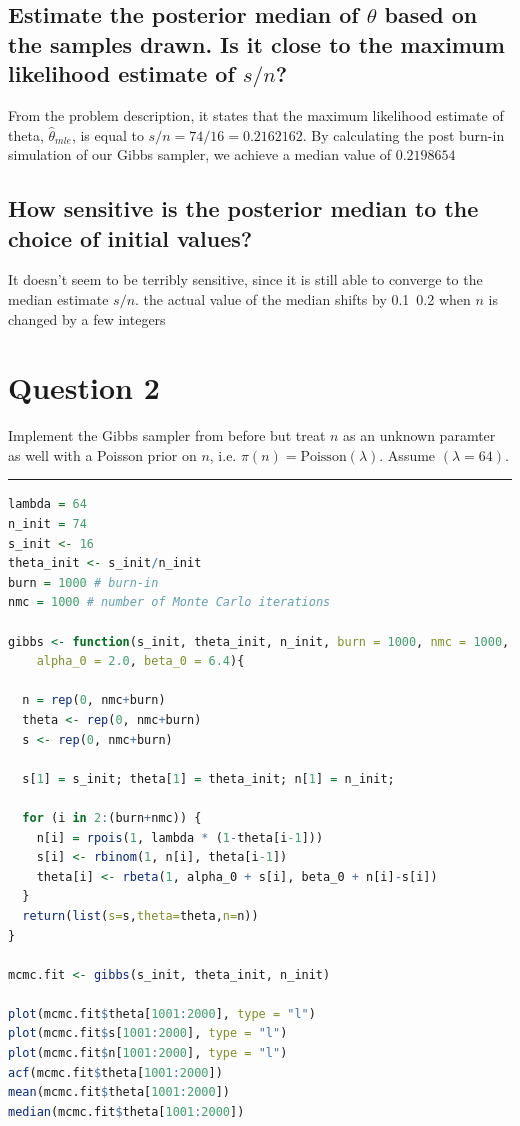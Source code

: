 \documentclass[20pt]{article} %
\begin{document}
\subsection{Estimate the posterior median of $\theta$ based on the samples drawn. Is it close to the maximum likelihood estimate of $s/n$?}
From the problem description, it states that the maximum likelihood estimate of theta, $\hat{\theta}_{mle}$, is equal to $s/n = 74/16 = 0.2162162$.  By calculating the post burn-in simulation of our Gibbs sampler, we achieve a median value of $0.2198654$
\subsection{How sensitive is the posterior median to the choice of initial values?}
It doesn't seem to be terribly sensitive, since it is still able to converge to the median estimate $s/n$. the actual value of the median shifts by 0.1~0.2 when $n$ is changed by a few integers

\newpage
\section{Question 2}
Implement the Gibbs sampler from before but treat $n$ as an unknown paramter as well with a Poisson prior on $n$, i.e. $\pi(n) = \text{Poisson}(\lambda)$.  Assume $(\lambda = 64)$.
\noindent\rule{2cm}{0.4pt} 
\begin{lstlisting}[language=R]
lambda = 64
n_init = 74
s_init <- 16
theta_init <- s_init/n_init
burn = 1000 # burn-in
nmc = 1000 # number of Monte Carlo iterations

gibbs <- function(s_init, theta_init, n_init, burn = 1000, nmc = 1000, 
	alpha_0 = 2.0, beta_0 = 6.4){
  
  n = rep(0, nmc+burn)
  theta <- rep(0, nmc+burn)
  s <- rep(0, nmc+burn)
  
  s[1] = s_init; theta[1] = theta_init; n[1] = n_init;
  
  for (i in 2:(burn+nmc)) {
    n[i] = rpois(1, lambda * (1-theta[i-1]))
    s[i] <- rbinom(1, n[i], theta[i-1])
    theta[i] <- rbeta(1, alpha_0 + s[i], beta_0 + n[i]-s[i])
  }
  return(list(s=s,theta=theta,n=n))
}

mcmc.fit <- gibbs(s_init, theta_init, n_init)

plot(mcmc.fit$theta[1001:2000], type = "l")
plot(mcmc.fit$s[1001:2000], type = "l")
plot(mcmc.fit$n[1001:2000], type = "l")
acf(mcmc.fit$theta[1001:2000])
mean(mcmc.fit$theta[1001:2000])
median(mcmc.fit$theta[1001:2000])
\end{lstlisting}
\end{document}
